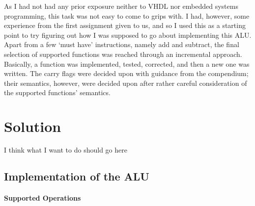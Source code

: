 \documentclass{article}
\begin{document}
As I had not had any prior exposure neither to VHDL nor embedded systems programming, this task was not easy to come to grips with. I had, however, some experience from the first assignment given to us, and so I used this as a starting point to try figuring out how I was supposed to go about implementing this ALU. Apart from a few `must have' instructions, namely add and subtract, the final selection of supported functions was reached through an incremental approach. Basically, a function was implemented, tested, corrected, and then a new one was written. The carry flags were decided upon with guidance from the compendium; their semantics, however, were decided upon after rather careful consideration of the supported functions' semantics. 

\section{Solution}
\label{sec:solution}
I think what I want to do should go here
\subsection{Implementation of the ALU}
\label{sec:implementation}

\paragraph{Supported Operations}
\label{ops}
\end{document}
